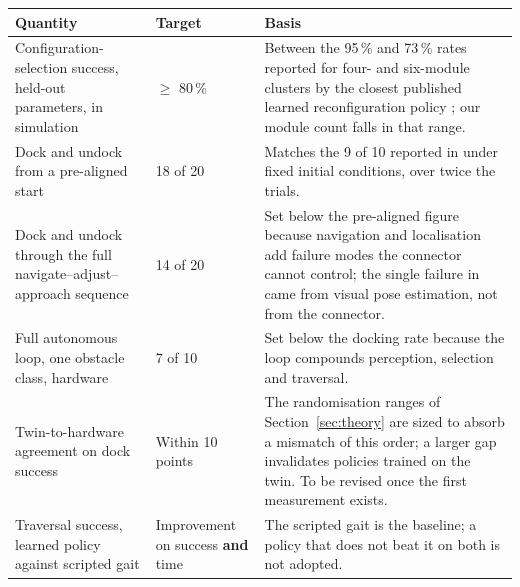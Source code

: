 \documentclass[11pt,a4paper]{article}
\newif\ifreview
\newenvironment{pblock}{\ifreview\color{blue}\fi}{}
\begin{document}
\begin{pblock}
\begin{longtable}{@{}L{0.32\textwidth} L{0.18\textwidth} L{0.42\textwidth}@{}}
\toprule
\textbf{Quantity} & \textbf{Target} & \textbf{Basis} \\
\midrule
\endhead
Configuration-selection success, held-out parameters, in simulation &
  $\geq$ 80\,\% &
  Between the 95\,\% and 73\,\% rates reported for four- and six-module
  clusters by the closest published learned reconfiguration policy
  \cite{liub2025}; our module count falls in that range. \\
Dock and undock from a pre-aligned start &
  18 of 20 &
  Matches the 9 of 10 reported in \cite{an2026} under fixed initial
  conditions, over twice the trials. \\
Dock and undock through the full navigate--adjust--approach sequence &
  14 of 20 &
  Set below the pre-aligned figure because navigation and localisation add
  failure modes the connector cannot control; the single failure in
  \cite{an2026} came from visual pose estimation, not from the connector. \\
Full autonomous loop, one obstacle class, hardware &
  7 of 10 &
  Set below the docking rate because the loop compounds perception, selection
  and traversal. \\
Twin-to-hardware agreement on dock success &
  Within 10 points &
  The randomisation ranges of Section~\ref{sec:theory} are sized to absorb a
  mismatch of this order; a larger gap invalidates policies trained on the
  twin. To be revised once the first measurement exists. \\
Traversal success, learned policy against scripted gait &
  Improvement on success \textbf{and} time &
  The scripted gait is the baseline; a policy that does not beat it on both is
  not adopted. \\
\bottomrule
\end{longtable}
\end{pblock}
\end{document}
